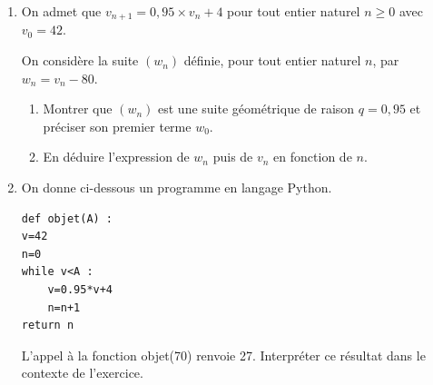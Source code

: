 \documentclass[10pt]{article}
\begin{document}
\begin{enumerate}
\item  On admet que $v_{n+1} = 0,95\times v_n + 4$ pour tout entier naturel $n\geqslant 0$ avec $v_0 = 42$.

On considère la suite $(w_n)$ définie, pour tout entier naturel $n$, par $w_n= v_n-80$.
	\begin{enumerate}
		\item Montrer que $\left(w_n\right)$ est une suite géométrique de raison $q = 0,95$ et préciser son premier terme $w_0$.
		\item En déduire l'expression de $w_n$ puis de $ v_n$ en fonction de $n$.

	\end{enumerate}
\item On donne ci-dessous un programme en langage Python.

\begin{center}
\begin{lstlisting}[style=python]
def objet(A) :
v=42
n=0
while v<A :
	v=0.95*v+4
	n=n+1
return n 
\end{lstlisting}
\end{center}

L'appel à la fonction objet(70) renvoie 27. Interpréter ce résultat dans le contexte de l'exercice.
\end{enumerate}
\end{document}
